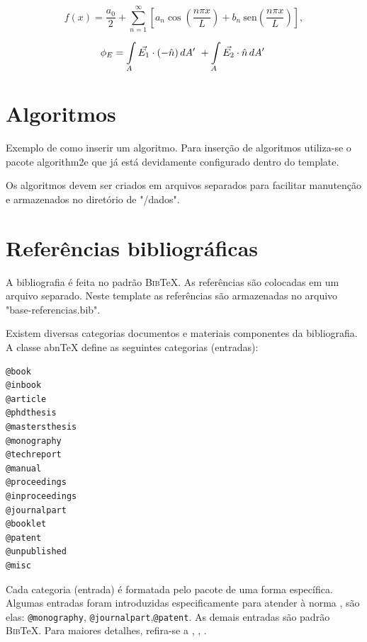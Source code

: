 \begin{equation}
    \label{eq:equacao-exemplo1}
    f(x) = \frac{a_0}{2} + \sum_{n=1}^{\infty} \left[a_n \cos{ \left( \frac{ n\pi x}{L} \right) }  +  b_n  \: \mathrm{sen}{ \left( \frac{ n\pi x}{L} \right) }     \right]
    ,
\end{equation}

\begin{equation}
    \phi_E  = \int \limits_{A} \Vec{E_1}\cdot (-\Hat{n}) \, dA'\ + \int \limits_{A} \Vec{E_2}\cdot \Hat{n} \, dA'\
    \label{eq:equacao-exemplo2}
\end{equation}

\section{Algoritmos}
\label{sec:algoritmos}

Exemplo de como inserir um algoritmo. Para inserção de algoritmos utiliza-se o pacote {\ttfamily algorithm2e} que já está devidamente configurado dentro do template.

Os algoritmos devem ser criados em arquivos separados para facilitar manutenção e armazenados no diretório de "/dados". \\



\section{Referências bibliográficas}
\label{sec:referenciasBibliograficas}

A bibliografia é feita no padrão \textsc{Bib}\TeX{}. As referências são colocadas em um arquivo separado. Neste template as referências são armazenadas no arquivo "base-referencias.bib".

Existem diversas categorias documentos e materiais componentes da bibliografia. A classe abn\TeX{} define as seguintes categorias (entradas):

\begin{verbatim}
@book
@inbook
@article
@phdthesis
@mastersthesis
@monography
@techreport
@manual
@proceedings
@inproceedings
@journalpart
@booklet
@patent
@unpublished
@misc
\end{verbatim}

Cada categoria (entrada) é formatada pelo pacote  de uma forma específica. Algumas entradas foram introduzidas especificamente para atender à norma , são elas: \verb|@monography|, \verb|@journalpart|,\verb|@patent|. As demais entradas são padrão \textsc{Bib}\TeX{}. Para maiores detalhes, refira-se a , , .
